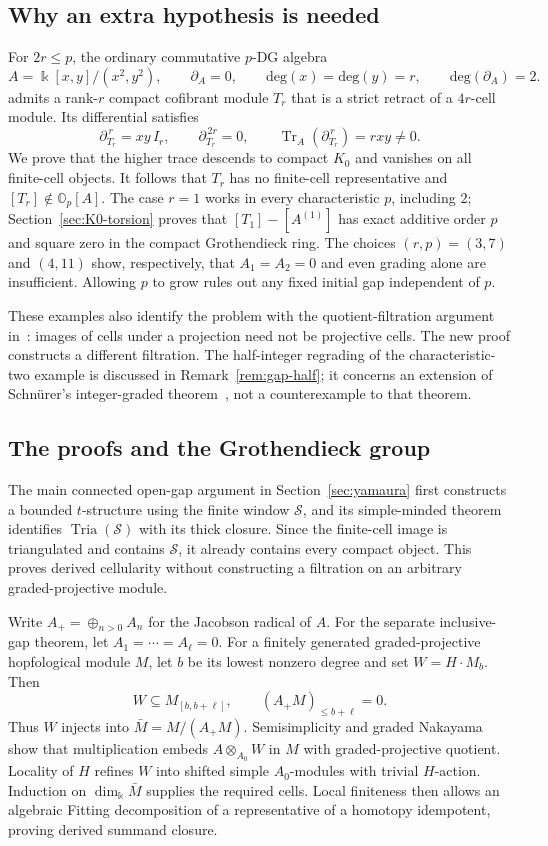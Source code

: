\documentclass[11pt]{article}
\theoremstyle{definition}
\numberwithin{equation}{section}
\def\dif{\partial}
\newcommand{\kk}{\Bbbk}
\newcommand{\tria}{\operatorname{Tria}}
\begin{document}
\subsection{Why an extra hypothesis is needed}
For $2r\le p$, the ordinary commutative $p$-DG algebra
\[
 A=\kk[x,y]/(x^2,y^2),\qquad \partial_A=0,\qquad \mathrm{deg}(x)=\mathrm{deg}(y)=r, \qquad \mathrm{deg}(\dif_A)=2.
\]
admits a rank-$r$ compact cofibrant module $T_r$ that is a strict retract
of a $4r$-cell module.  Its differential satisfies
\[
 \partial_{T_r}^{\,r}=xy\,I_r,\qquad
 \partial_{T_r}^{\,2r}=0,\qquad
 \operatorname{Tr}_{A}(\partial_{T_r}^{\,r})=rxy\ne0.
\]
We prove that the higher trace descends to compact $K_0$ and vanishes on
all finite-cell objects.  It follows that $T_r$ has no finite-cell
representative and $[T_r]\notin\mathbb O_p[A]$.  The case $r=1$ works
in every characteristic $p$, including $2$; Section~\ref{sec:K0-torsion}
proves that $[T_1]-[A^{(1)}]$ has exact additive order $p$ and square
zero in the compact Grothendieck ring.  The choices $(r,p)=(3,7)$ and
$(4,11)$ show,
respectively, that $A_1=A_2=0$ and even grading alone are insufficient.
Allowing $p$ to grow rules out any fixed initial gap independent of $p$.

These examples also identify the problem with the quotient-filtration
argument in~\cite[Lemma~2.14]{EQ1}: images of cells under a projection need
not be projective cells.  The new proof constructs a different filtration.
The half-integer regrading of the characteristic-two example is discussed
in Remark~\ref{rem:gap-half}; it concerns an extension of Schn\"urer's
integer-graded theorem~\cite{SchPos}, not a counterexample to that theorem.

\subsection{The proofs and the Grothendieck group}
The main connected open-gap argument in Section~\ref{sec:yamaura}
first constructs a bounded $t$-structure using the finite window
$\mathcal S$, and its simple-minded theorem identifies
$\tria(\mathcal S)$ with its thick closure.  Since the finite-cell image
is triangulated and contains $\mathcal S$, it already contains every
compact object.  This proves derived cellularity without constructing
a filtration on an arbitrary graded-projective module.

Write $A_+=\oplus_{n>0}A_n$ for the Jacobson radical of $A$.  For the separate inclusive-gap theorem, let $A_1=\cdots=A_\ell=0$.
For a finitely generated graded-projective hopfological module
$M$, let $b$ be its lowest nonzero degree and set $W=H\cdot M_b$.  Then
\[
 W\subseteq M_{[b,b+\ell]},\qquad
 (A_+M)_{\le b+\ell}=0.
\]
Thus $W$ injects into $\bar M=M/(A_+M)$.  Semisimplicity and graded
Nakayama show that multiplication embeds $A\otimes_{A_0}W$ in $M$ with
graded-projective quotient.  Locality of $H$ refines $W$ into shifted
simple $A_0$-modules with trivial $H$-action.  Induction on
$\dim_\kk\bar M$ supplies the required cells.  Local finiteness then
allows an algebraic Fitting decomposition of a representative of a
homotopy idempotent, proving derived summand closure.
\end{document}
